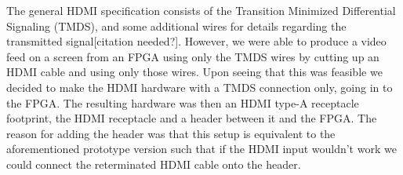 The general HDMI specification consists of the Transition Minimized Differential Signaling (TMDS),
and some additional wires for details regarding the transmitted signal[citation needed?].
However, we were able to produce a video feed on a screen from an FPGA using only the TMDS wires by cutting up an HDMI cable and using only those wires.
Upon seeing that this was feasible we decided to make the HDMI hardware with a TMDS connection only,
going in to the FPGA. The resulting hardware was then an HDMI type-A receptacle footprint,
the HDMI receptacle and a header between it and the FPGA.
The reason for adding the header was that this setup is equivalent to the aforementioned prototype
version such that if the HDMI input wouldn't work we could connect the reterminated HDMI cable onto the header.
